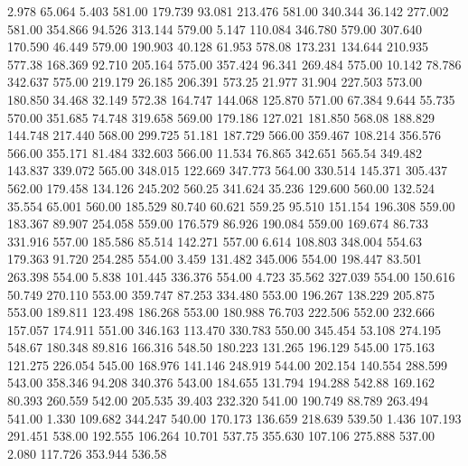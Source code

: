    2.978   65.064    5.403       581.00
 179.739   93.081  213.476       581.00
 340.344   36.142  277.002       581.00
 354.866   94.526  313.144       579.00
   5.147  110.084  346.780       579.00
 307.640  170.590   46.449       579.00
 190.903   40.128   61.953       578.08
 173.231  134.644  210.935       577.38
 168.369   92.710  205.164       575.00
 357.424   96.341  269.484       575.00
  10.142   78.786  342.637       575.00
 219.179   26.185  206.391       573.25
  21.977   31.904  227.503       573.00
 180.850   34.468   32.149       572.38
 164.747  144.068  125.870       571.00
  67.384    9.644   55.735       570.00
 351.685   74.748  319.658       569.00
 179.186  127.021  181.850       568.08
 188.829  144.748  217.440       568.00
 299.725   51.181  187.729       566.00
 359.467  108.214  356.576       566.00
 355.171   81.484  332.603       566.00
  11.534   76.865  342.651       565.54
 349.482  143.837  339.072       565.00
 348.015  122.669  347.773       564.00
 330.514  145.371  305.437       562.00
 179.458  134.126  245.202       560.25
 341.624   35.236  129.600       560.00
 132.524   35.554   65.001       560.00
 185.529   80.740   60.621       559.25
  95.510  151.154  196.308       559.00
 183.367   89.907  254.058       559.00
 176.579   86.926  190.084       559.00
 169.674   86.733  331.916       557.00
 185.586   85.514  142.271       557.00
   6.614  108.803  348.004       554.63
 179.363   91.720  254.285       554.00
   3.459  131.482  345.006       554.00
 198.447   83.501  263.398       554.00
   5.838  101.445  336.376       554.00
   4.723   35.562  327.039       554.00
 150.616   50.749  270.110       553.00
 359.747   87.253  334.480       553.00
 196.267  138.229  205.875       553.00
 189.811  123.498  186.268       553.00
 180.988   76.703  222.506       552.00
 232.666  157.057  174.911       551.00
 346.163  113.470  330.783       550.00
 345.454   53.108  274.195       548.67
 180.348   89.816  166.316       548.50
 180.223  131.265  196.129       545.00
 175.163  121.275  226.054       545.00
 168.976  141.146  248.919       544.00
 202.154  140.554  288.599       543.00
 358.346   94.208  340.376       543.00
 184.655  131.794  194.288       542.88
 169.162   80.393  260.559       542.00
 205.535   39.403  232.320       541.00
 190.749   88.789  263.494       541.00
   1.330  109.682  344.247       540.00
 170.173  136.659  218.639       539.50
   1.436  107.193  291.451       538.00
 192.555  106.264   10.701       537.75
 355.630  107.106  275.888       537.00
   2.080  117.726  353.944       536.58
